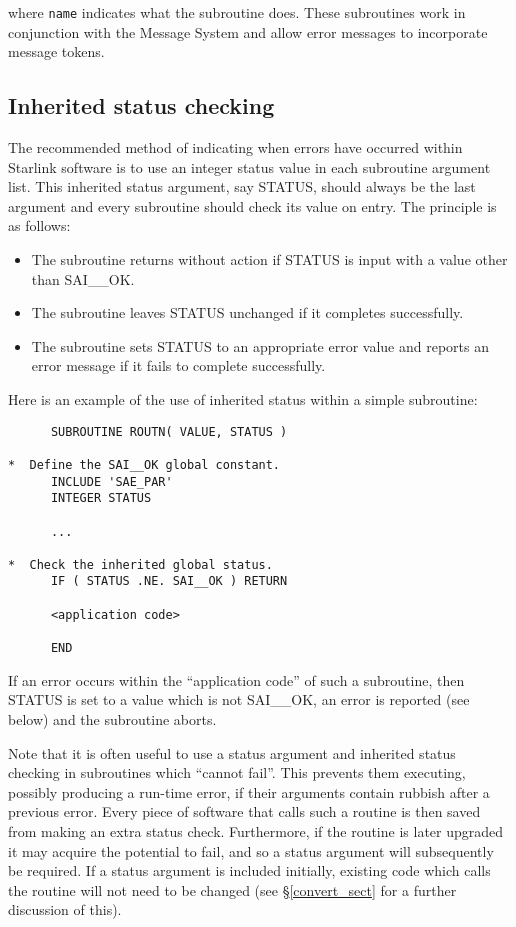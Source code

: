 where {\tt name} indicates what the subroutine does.
These subroutines work in conjunction with the Message System and allow error
messages to incorporate message tokens. 


\subsection {Inherited status checking} \label{inherit_sect}

The recommended method of indicating when errors have occurred within
Starlink software is to use an integer status value in each subroutine
argument list. 
This inherited status argument, say STATUS, should always be the last
argument and every subroutine should check its value on entry. 
The principle is as follows:

\begin {itemize}
\item The subroutine returns without action if STATUS is input with a value
other than SAI\_\_OK. 

\item The subroutine leaves STATUS unchanged if it completes successfully.

\item The subroutine sets STATUS to an appropriate error value and reports an
error message if it fails to complete successfully. 
\end {itemize}

Here is an example of the use of inherited status within a simple subroutine:

\begin {small}
\begin{verbatim}
      SUBROUTINE ROUTN( VALUE, STATUS )
      
*  Define the SAI__OK global constant.
      INCLUDE 'SAE_PAR'
      INTEGER STATUS

      ...

*  Check the inherited global status.
      IF ( STATUS .NE. SAI__OK ) RETURN

      <application code>

      END
\end{verbatim}
\end {small}

If an error occurs within the ``application code'' of such a subroutine, then
STATUS is set to a value which is not SAI\_\_OK, an error is reported (see
below) and the subroutine aborts. 

Note that it is often useful to use a status argument and inherited status
checking in subroutines which ``cannot fail''. 
This prevents them executing, possibly producing a run-time error, if
their arguments contain rubbish after a previous error.
Every piece of software that calls such a routine is then saved from making
an extra status check. 
Furthermore, if the routine is later upgraded it may acquire the potential
to fail, and so a status argument will subsequently be required.
If a status argument is included initially, existing code which calls 
the routine will not need to be changed (see \S\ref{convert_sect} for a 
further discussion of this).


